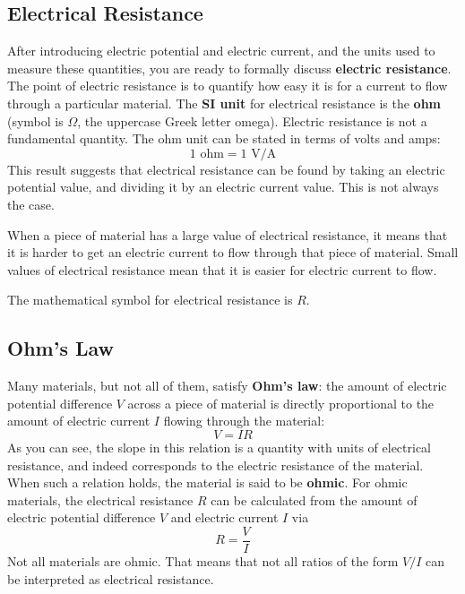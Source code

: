 \subsection{Electrical Resistance}
%
After introducing electric potential and electric current, and the units used to measure these quantities, you are ready to formally discuss \textbf{electric resistance}. The point of electric resistance is to quantify how easy it is for a current to flow through a particular material. The \textbf{SI unit} for electrical resistance is the \textbf{ohm} (symbol is $\Omega$, the uppercase Greek letter omega). Electric resistance is not a fundamental quantity. The ohm unit can be stated in terms of volts and amps:
\begin{equation}
	1 \text{ ohm} = 1 \text{ V/A}
\end{equation}
This result suggests that electrical resistance can be found by taking an electric potential value, and dividing it by an electric current value. This is not always the case.

When a piece of material has a large value of electrical resistance, it means that it is harder to get an electric current to flow through that piece of material. Small values of electrical resistance mean that it is easier for electric current to flow.

The mathematical symbol for electrical resistance is $R$.
%
\subsection{Ohm's Law}
%
Many materials, but not all of them, satisfy \textbf{Ohm's law}: the amount of electric potential difference $V$ across a piece of material is directly proportional to the amount of electric current $I$ flowing through the material:
\begin{equation}
	V = IR
\end{equation}
As you can see, the slope in this relation is a quantity with units of electrical resistance, and indeed corresponds to the electric resistance of the material. When such a relation holds, the material is said to be \textbf{ohmic}. For ohmic materials, the electrical resistance $R$ can be calculated from the amount of electric potential difference $V$ and electric current $I$ via
\begin{equation}
	R = \frac{V}{I}
	\label{eq.02.ohms.law}
\end{equation}
Not all materials are ohmic. That means that not all ratios of the form $V/I$ can be interpreted as electrical resistance.
%
